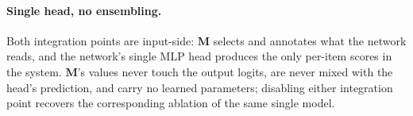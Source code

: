 \paragraph{Single head, no ensembling.}
Both integration points are input-side: $\mathbf{M}$ selects and annotates what the
network reads, and the network's single MLP head produces the only per-item scores
in the system. $\mathbf{M}$'s values never touch the output logits, are never mixed
with the head's prediction, and carry no learned parameters; disabling either
integration point recovers the corresponding ablation of the same single model.
